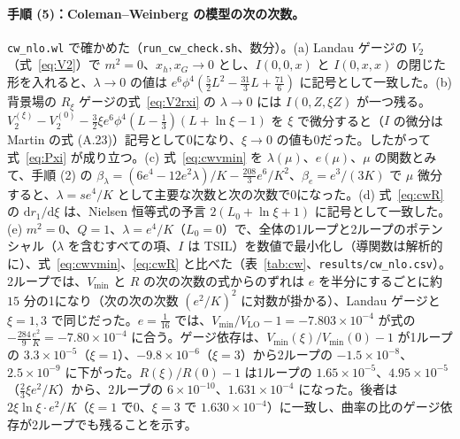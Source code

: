\documentclass[a4paper,10pt]{ltjsarticle}
\newcommand{\dd}{\mathrm{d}}
\begin{document}
\paragraph{手順 (5)：Coleman--Weinberg の模型の次の次数。}\texttt{cw\_nlo.wl} で確かめた（\texttt{run\_cw\_check.sh}、数分）。(a) Landau ゲージの $V_2$（式~\eqref{eq:V2}）で $m^2=0$、$x_h,x_G\to0$ とし、$I(0,0,x)$ と $I(0,x,x)$ の閉じた形を入れると、$\lambda\to0$ の値は $e^6\phi^4(\frac52L^2-\frac{31}3L+\frac{71}6)$ に記号として一致した。(b) 背景場の $R_\xi$ ゲージの式~\eqref{eq:V2rxi} の $\lambda\to0$ には $I(0,Z,\xi Z)$ が一つ残る。$V_2^{(\xi)}-V_2^{(0)}-\frac32\xi e^6\phi^4(L-\frac13)(L+\ln\xi-1)$ を $\xi$ で微分すると（$I$ の微分は Martin の式 (A.23)）記号として0になり、$\xi\to0$ の値も0だった。したがって式~\eqref{eq:Pxi} が成り立つ。(c) 式~\eqref{eq:cwvmin} を $\lambda(\mu)$、$e(\mu)$、$\mu$ の関数とみて、手順 (2) の $\beta_\lambda=(6e^4-12e^2\lambda)/K-\frac{208}3e^6/K^2$、$\beta_e=e^3/(3K)$ で $\mu$ 微分すると、$\lambda=se^4/K$ として主要な次数と次の次数で0になった。(d) 式~\eqref{eq:cwR} の $\dd r_1/\dd\xi$ は、Nielsen 恒等式の予言 $2(L_0+\ln\xi+1)$ に記号として一致した。(e) $m^2=0$、$Q=1$、$\lambda=e^4/K$（$L_0=0$）で、全体の1ループと2ループのポテンシャル（$\lambda$ を含むすべての項、$I$ は TSIL）を数値で最小化し（導関数は解析的に）、式~\eqref{eq:cwvmin}、\eqref{eq:cwR} と比べた（表~\ref{tab:cw}、\texttt{results/cw\_nlo.csv}）。2ループでは、$V_{\min}$ と $R$ の次の次数の式からのずれは $e$ を半分にするごとに約 $15$ 分の1になり（次の次の次数 $(e^2/K)^2$ に対数が掛かる）、Landau ゲージと $\xi=1,3$ で同じだった。$e=\frac1{16}$ では、$V_{\min}/V_{\mathrm{LO}}-1=-7.803\times10^{-4}$ が式の $-\frac{284}9\frac{e^2}K=-7.80\times10^{-4}$ に合う。ゲージ依存は、$V_{\min}(\xi)/V_{\min}(0)-1$ が1ループの $3.3\times10^{-5}$（$\xi=1$）、$-9.8\times10^{-6}$（$\xi=3$）から2ループの $-1.5\times10^{-8}$、$2.5\times10^{-9}$ に下がった。$R(\xi)/R(0)-1$ は1ループの $1.65\times10^{-5}$、$4.95\times10^{-5}$（$\frac23\xi e^2/K$）から、2ループの $6\times10^{-10}$、$1.631\times10^{-4}$ になった。後者は $2\xi\ln\xi\cdot e^2/K$（$\xi=1$ で0、$\xi=3$ で $1.630\times10^{-4}$）に一致し、曲率の比のゲージ依存が2ループでも残ることを示す。
\end{document}

